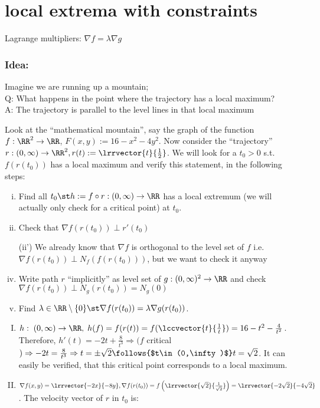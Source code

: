 \section{local extrema with constraints}
Lagrange multipliers: $\nabla f=\lambda\nabla g$\\
\subsubsection*{Idea:}
Imagine we are running up a mountain;\\
Q: What happens in the point where the trajectory has a local maximum?\\
A: The trajectory is parallel to the level lines in that local maximum
\begin{exam}
  Look at the ``mathematical mountain'', say the graph of the function $f:\RR^2\to\RR$, $F(x,y):=16-x^2-4y^2$. Now consider the ``trajectory'' $r:(0,\infty)\to\RR^2, r(t):=\lrrvector{t}{\frac{1}{2}}$. We will look for a $t_0>0$ s.t. $f(r(t_0))$ has a local maximum and verify this statement, in the following steps:
  \begin{enumerate}[(i)]
  	\item Find all $t_0\st h:=f\circ r:(0,\infty)\to\RR$ has a local extremum (we will actually only check for a critical point) at $t_0$.
  	\item Check that $\nabla f(r(t_0))\perp r'(t_0)$
  	\item[(ii')] We already know that $\nabla f$ is orthogonal to the level set of $f$ i.e. $\nabla f(r(t_0))\perp N_f(f(r(t_0)))$, but we want to check it anyway
  	\item Write path $r$ ``implicitly'' as level set of $g:(0,\infty)^2\to\RR$ and check $\nabla f(r(t_0))\perp N_g(r(t_0))=N_g(0)$
  	\item Find $\lambda\in\RR\setminus\{0\} \st \nabla f(r(t_0))=\lambda\nabla g(r(t_0))$.
  \end{enumerate}
  \begin{enumerate}[(I)]
  	\item $h:\;(0,\infty)\to\RR,\; h(f)=f(r(t))=f(\lccvector{t}{\frac{1}{t}})=16-t^2-\frac{4}{t^2}$. Therefore, $h'(t)=-2t+\frac{8}{t^3}\Rightarrow (f$ critical$)\Rightarrow-2t=\frac{8}{t^3}\Rightarrow t=\pm\sqrt{2}\follows{$t\in(0,\infty)$}t=\sqrt{2}$. It can easily be verified, that this critical point corresponds to a local maximum. 
  	\item $\nabla f(x,y)=\lrrvector{-2x}{-8y}, \nabla f(r(t_0))=f\left(\lrrvector{\sqrt{2}}{\frac{1}{\sqrt{2}}}\right)=\lrrvector{-2\sqrt{2}}{-4\sqrt{2}}$. The velocity vector of $r$ in $t_0$ is:

\end{enumerate}
\end{exam}

